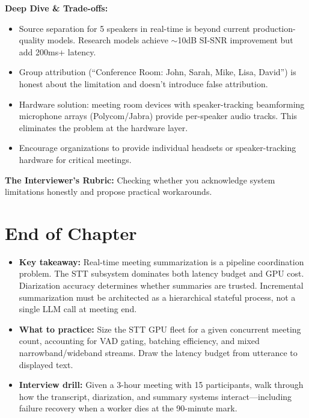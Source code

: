 \textbf{Deep Dive \& Trade-offs:}
\begin{itemize}
  \item Source separation for 5 speakers in real-time is beyond current production-quality models. Research models achieve $\sim$10dB SI-SNR improvement but add 200ms+ latency.
  \item Group attribution (``Conference Room: John, Sarah, Mike, Lisa, David'') is honest about the limitation and doesn't introduce false attribution.
  \item Hardware solution: meeting room devices with speaker-tracking beamforming microphone arrays (Polycom/Jabra) provide per-speaker audio tracks. This eliminates the problem at the hardware layer.
  \item Encourage organizations to provide individual headsets or speaker-tracking hardware for critical meetings.
\end{itemize}

\textbf{The Interviewer's Rubric:} Checking whether you acknowledge system limitations honestly and propose practical workarounds.

\section*{End of Chapter}

\begin{itemize}
  \item \textbf{Key takeaway:} Real-time meeting summarization is a pipeline coordination problem. The STT subsystem dominates both latency budget and GPU cost. Diarization accuracy determines whether summaries are trusted. Incremental summarization must be architected as a hierarchical stateful process, not a single LLM call at meeting end.
  \item \textbf{What to practice:} Size the STT GPU fleet for a given concurrent meeting count, accounting for VAD gating, batching efficiency, and mixed narrowband/wideband streams. Draw the latency budget from utterance to displayed text.
  \item \textbf{Interview drill:} Given a 3-hour meeting with 15 participants, walk through how the transcript, diarization, and summary systems interact---including failure recovery when a worker dies at the 90-minute mark.
\end{itemize}
